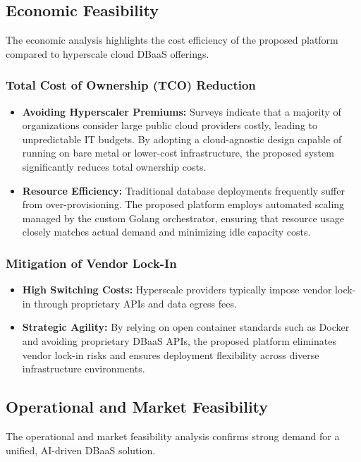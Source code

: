 \subsection{Economic Feasibility}

The economic analysis highlights the cost efficiency of the proposed platform compared to hyperscale cloud DBaaS offerings.

\subsubsection*{Total Cost of Ownership (TCO) Reduction}
\begin{itemize}
    \item \textbf{Avoiding Hyperscaler Premiums:} Surveys indicate that a majority of organizations consider large public cloud providers costly, leading to unpredictable IT budgets. By adopting a cloud-agnostic design capable of running on bare metal or lower-cost infrastructure, the proposed system significantly reduces total ownership costs.
    \item \textbf{Resource Efficiency:} Traditional database deployments frequently suffer from over-provisioning. The proposed platform employs automated scaling managed by the custom Golang orchestrator, ensuring that resource usage closely matches actual demand and minimizing idle capacity costs.
\end{itemize}

\subsubsection*{Mitigation of Vendor Lock-In}
\begin{itemize}
    \item \textbf{High Switching Costs:} Hyperscale providers typically impose vendor lock-in through proprietary APIs and data egress fees.
    \item \textbf{Strategic Agility:} By relying on open container standards such as Docker and avoiding proprietary DBaaS APIs, the proposed platform eliminates vendor lock-in risks and ensures deployment flexibility across diverse infrastructure environments.
\end{itemize}

\subsection{Operational and Market Feasibility}

The operational and market feasibility analysis confirms strong demand for a unified, AI-driven DBaaS solution.

